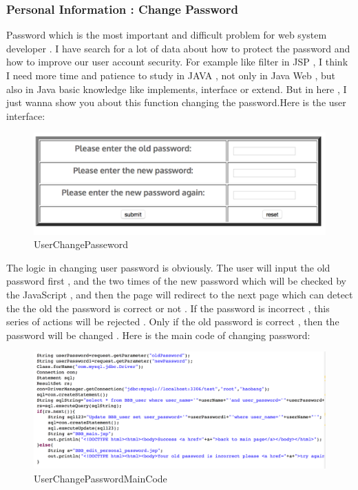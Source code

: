 \documentclass[12pt]{article}
\begin{document}
\subsubsection{Personal Information : Change Password}
Password which is the most important and difficult problem  for web system developer . I have search for a lot of data about how to protect the password and how to improve our user account security. For example like filter in JSP , I think I need more time and patience to study in  JAVA , not only in Java Web , but also in Java basic knowledge like implements, interface or extend. But in here , I just wanna show you about this function changing the password.Here is the user interface:
\begin{figure}[H]
	\centering	
	\includegraphics[width=15cm]{images/UserChangePasseword.jpg}

	\caption[UserChangePasseword]{UserChangePasseword}
	\label{fig:UserChangePasseword}
\end{figure}
The logic in changing user password is obviously. The user will input the old password first , and the two times of the new password which will be checked by the JavaScript , and then the page will redirect to the next page which can detect the the old the password is correct or not . If the password is incorrect , this series of actions will be rejected . Only if the old password is correct , then the password will be changed . Here is  the main code of changing password:
\begin{figure}[H]
	\centering	
	\includegraphics[width=15cm]{images/UserChangePasswordMainCode.jpg}

	
	\caption[UserChangePasswordMainCode]{UserChangePasswordMainCode}
	\label{fig:UserChangePasswordMainCode}
\end{figure}
\end{document}
